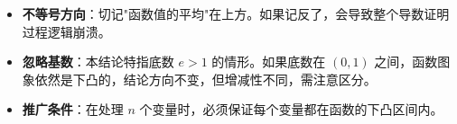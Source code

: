 \begin{trapbox}
\begin{itemize}
    \item \textbf{不等号方向}：切记"函数值的平均"在上方。如果记反了，会导致整个导数证明过程逻辑崩溃。
    \item \textbf{忽略基数}：本结论特指底数 $e > 1$ 的情形。如果底数在 $(0, 1)$ 之间，函数图象依然是下凸的，结论方向不变，但增减性不同，需注意区分。
    \item \textbf{推广条件}：在处理 $n$ 个变量时，必须保证每个变量都在函数的下凸区间内。
\end{itemize}
\end{trapbox}